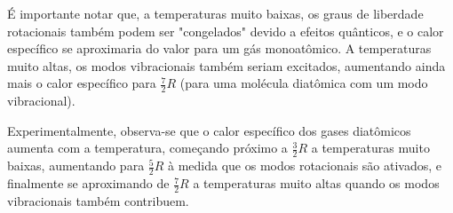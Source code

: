 \documentclass[fleqn,a4paper]{article}
\begin{document}
É importante notar que, a temperaturas muito baixas, os graus de liberdade rotacionais também podem ser "congelados" devido a efeitos quânticos, e o calor específico se aproximaria do valor para um gás monoatômico. A temperaturas muito altas, os modos vibracionais também seriam excitados, aumentando ainda mais o calor específico para $\frac{7}{2}R$ (para uma molécula diatômica com um modo vibracional).

Experimentalmente, observa-se que o calor específico dos gases diatômicos aumenta com a temperatura, começando próximo a $\frac{3}{2}R$ a temperaturas muito baixas, aumentando para $\frac{5}{2}R$ à medida que os modos rotacionais são ativados, e finalmente se aproximando de $\frac{7}{2}R$ a temperaturas muito altas quando os modos vibracionais também contribuem.
\end{document}
